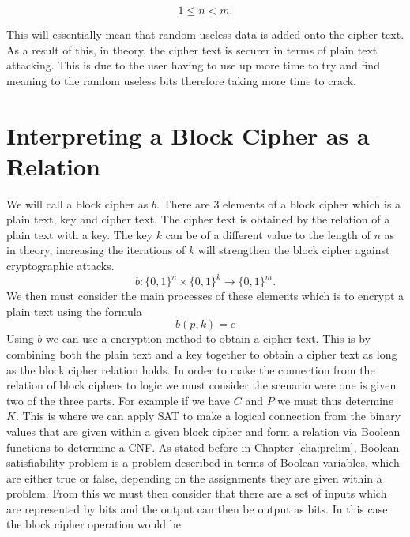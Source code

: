 \documentclass[11pt,a4paper, notitlepage]{report}
\begin{document}
\begin{displaymath}
1 \leq n < m.
\end{displaymath}

This will essentially mean that random useless data is added onto the cipher text. As a result of this, in theory, the cipher text is securer in terms of plain text attacking. This is due to the user having to use up more time to try and find meaning to the random useless bits therefore taking more time to crack.

\section{Interpreting a Block Cipher as a Relation}
\label{sec:ExampleBlock}

We will call a block cipher as $b$. There are 3 elements of a block cipher which is a plain text, key and cipher text. The cipher text is obtained by the relation of a plain text with a key. The key $k$ can be of a different value to the length of $n$ as in theory, increasing the iterations of $k$ will strengthen the block cipher against cryptographic attacks.  
\begin{displaymath}
b: \{0,1\}^n \times \{0,1\}^k \rightarrow \{0,1\}^m.
\end{displaymath}
We then must consider the main processes of these elements which is to encrypt a plain text using the formula
\begin{displaymath}
b (p,k) = c
\end{displaymath}
Using $b$ we can use a encryption method to obtain a cipher text. This is by combining both the plain text and a key together to obtain a cipher text as long as the block cipher relation holds.  
In order to make the connection from the relation of block ciphers to logic we must consider the scenario were one is given two of the three parts. For example if we have $C$ and $P$ we must thus determine $K$. This is where we can apply SAT to make a logical connection from the binary values that are given within a given block cipher and form a relation via Boolean functions to determine a CNF.
As stated before in Chapter \ref{cha:prelim}, Boolean satisfiability problem is a problem described in terms of Boolean variables, which are either true or false, depending on the assignments they are given within a problem. From this we must then consider that there are a set of inputs which are represented by bits and the output can then be output as bits. In this case the block cipher operation would be
\end{document}

